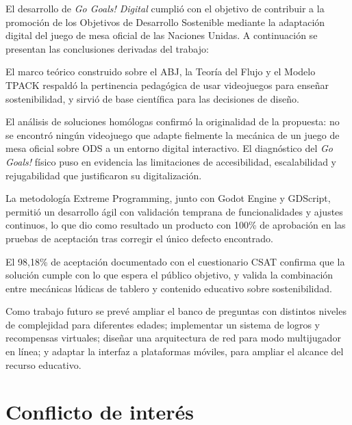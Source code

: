\documentclass[12pt,a4paper]{article}
\begin{document}
El desarrollo de \textit{Go Goals! Digital} cumplió con el objetivo de contribuir a la promoción de los Objetivos de Desarrollo Sostenible mediante la adaptación digital del juego de mesa oficial de las Naciones Unidas. A continuación se presentan las conclusiones derivadas del trabajo:

El marco teórico construido sobre el ABJ, la Teoría del Flujo y el Modelo TPACK respaldó la pertinencia pedagógica de usar videojuegos para enseñar sostenibilidad, y sirvió de base científica para las decisiones de diseño.

El análisis de soluciones homólogas confirmó la originalidad de la propuesta: no se encontró ningún videojuego que adapte fielmente la mecánica de un juego de mesa oficial sobre ODS a un entorno digital interactivo. El diagnóstico del \textit{Go Goals!} físico puso en evidencia las limitaciones de accesibilidad, escalabilidad y rejugabilidad que justificaron su digitalización.

La metodología Extreme Programming, junto con Godot Engine y GDScript, permitió un desarrollo ágil con validación temprana de funcionalidades y ajustes continuos, lo que dio como resultado un producto con 100\% de aprobación en las pruebas de aceptación tras corregir el único defecto encontrado.

El 98,18\% de aceptación documentado con el cuestionario CSAT confirma que la solución cumple con lo que espera el público objetivo, y valida la combinación entre mecánicas lúdicas de tablero y contenido educativo sobre sostenibilidad.

Como trabajo futuro se prevé ampliar el banco de preguntas con distintos niveles de complejidad para diferentes edades; implementar un sistema de logros y recompensas virtuales; diseñar una arquitectura de red para modo multijugador en línea; y adaptar la interfaz a plataformas móviles, para ampliar el alcance del recurso educativo.




\section*{Conflicto de interés}
\end{document}
